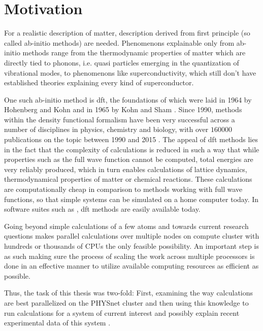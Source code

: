 \documentclass[main.tex]{subfiles}
\begin{document}
\chapter{Motivation}

For a realistic description of matter, description derived from first principle (so called ab-initio methods) are needed.
Phenomenons explainable only from ab-initio methods range from the thermodynamic properties of matter which are directly tied to phonons, i.e. quasi particles emerging in the quantization of vibrational modes, to phenomenons like superconductivity, which still don't have established theories explaining every kind of superconductor.

One such ab-initio method is \gls{dft}, the foundations of which were laid in 1964 by Hohenberg and Kohn \cite{hohenberg_inhomogeneous_1964} and in 1965 by Kohn and Sham \cite{kohn_self-consistent_1965}.
Since 1990, methods within the density functional formalism have been very successful across a number of disciplines in physics, chemistry and biology, with over \(160000\) publications on the topic between 1990 and 2015 \cite{jones_density_2015}.
The appeal of \gls{dft} methods lies in the fact that the complexity of calculations is reduced in such a way that while properties such as the full wave function cannot be computed, total energies are very reliably produced, which in turn enables calculations of lattice dynamics, thermodynamical properties of matter or chemical reactions.
These calculations are computationally cheap in comparison to methods working with full wave functions, so that simple systems can be simulated on a home computer today.
In software suites such as \QE \cite{giannozzi_quantum_2009,giannozzi_advanced_2017}, \gls{dft} methods are easily available today.

Going beyond simple calculations of a few atoms and towards current research questions makes parallel calculations over multiple nodes on compute cluster with hundreds or thousands of CPUs the only feasible possibility.
An important step is as such making sure the process of scaling the work across multiple processors is done in an effective manner to utilize available computing resources as efficient as possible.

Thus, the task of this thesis was two-fold:
First, examining the way \QE calculations are best parallelized on the PHYSnet cluster and then using this knowledge to run calculations for a system of current interest and possibly explain recent experimental data of this system \cite{hall_environmental_2019}.
\end{document}
